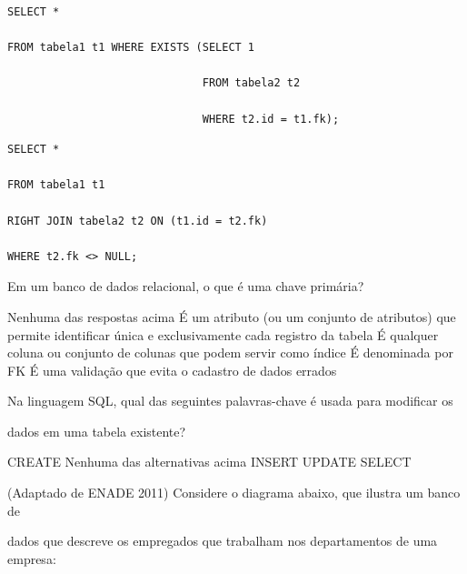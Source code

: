 \documentclass[12pt, addpoints]{exam}
\begin{document}
\begin{questions}
\begin{choices}
\begin{verbatim}
\end{verbatim}


\choice \begin{verbatim}SELECT *

FROM tabela1 t1 WHERE EXISTS (SELECT 1

                              FROM tabela2 t2

                              WHERE t2.id = t1.fk);

\end{verbatim}


\choice \begin{verbatim}SELECT *

FROM tabela1 t1

RIGHT JOIN tabela2 t2 ON (t1.id = t2.fk)

WHERE t2.fk <> NULL;

\end{verbatim}


\end{choices}

\question

Em um banco de dados relacional, o que é uma chave primária?


\begin{choices}
\choice Nenhuma das respostas acima
\choice É um atributo (ou um conjunto de atributos) que permite identificar única e exclusivamente cada registro da tabela
\choice É qualquer coluna ou conjunto de colunas que podem servir como índice
\choice É denominada por FK
\choice É uma validação que evita o cadastro de dados errados
\end{choices}

\question

Na linguagem SQL, qual das seguintes palavras-chave é usada para modificar os

dados em uma tabela existente?


\begin{choices}
\choice CREATE
\choice Nenhuma das alternativas acima
\choice INSERT
\choice UPDATE
\choice SELECT
\end{choices}

\question

(Adaptado de ENADE 2011) Considere o diagrama abaixo, que ilustra um banco de

dados que descreve os empregados que trabalham nos departamentos de uma empresa:

\begin{figure}[H]

  \centering


\end{figure}
\end{questions}
\end{document}
